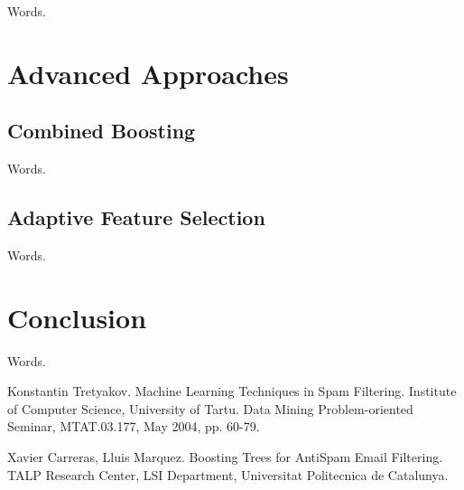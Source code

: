 \documentclass[12pt]{report}
\begin{document}
Words.

\newpage


\chapter{Advanced Approaches}

\section{Combined Boosting}

Words.

\newpage

\section{Adaptive Feature Selection}

Words.

\newpage


\chapter*{Conclusion}

Words.

\newpage



\begin{thebibliography}{30}

 Konstantin Tretyakov. Machine Learning Techniques in Spam Filtering. Institute of Computer Science, University of Tartu. Data Mining Problem-oriented Seminar, MTAT.03.177, May 2004, pp. 60-79.

 Xavier Carreras, Lluis Marquez. Boosting Trees for AntiSpam
Email Filtering. TALP Research Center, LSI Department, Universitat Politecnica de Catalunya.

\end{thebibliography}
\end{document}
